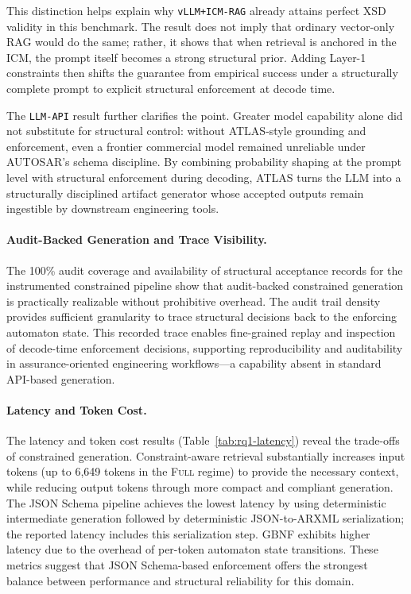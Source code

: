 \documentclass[acmlarge,nonacm]{acmart}
\theoremstyle{acmplain}
\theoremstyle{acmdefinition}
\begin{document}
This distinction helps explain why \texttt{vLLM+ICM-RAG} already attains perfect XSD validity in this benchmark. The result does not imply that ordinary vector-only RAG would do the same; rather, it shows that when retrieval is anchored in the ICM, the prompt itself becomes a strong structural prior. Adding Layer-1 constraints then shifts the guarantee from empirical success under a structurally complete prompt to explicit structural enforcement at decode time.

The \texttt{LLM-API} result further clarifies the point. Greater model capability alone did not substitute for structural control: without ATLAS-style grounding and enforcement, even a frontier commercial model remained unreliable under AUTOSAR's schema discipline. By combining probability shaping at the prompt level with structural enforcement during decoding, ATLAS turns the LLM into a structurally disciplined artifact generator whose accepted outputs remain ingestible by downstream engineering tools.

\paragraph{Audit-Backed Generation and Trace Visibility.}
The 100\% audit coverage and availability of structural acceptance records for the instrumented constrained pipeline show that audit-backed constrained generation is practically realizable without prohibitive overhead.
The audit trail density provides sufficient granularity to trace structural decisions back to the enforcing automaton state.
This recorded trace enables fine-grained replay and inspection of decode-time enforcement decisions, supporting reproducibility and auditability in assurance-oriented engineering workflows—a capability absent in standard API-based generation.

\paragraph{Latency and Token Cost.}
The latency and token cost results (Table~\ref{tab:rq1-latency}) reveal the trade-offs of constrained generation. Constraint-aware retrieval substantially increases input tokens (up to 6,649 tokens in the \textsc{Full} regime) to provide the necessary context, while reducing output tokens through more compact and compliant generation. The JSON Schema pipeline achieves the lowest latency by using deterministic intermediate generation followed by deterministic JSON-to-ARXML serialization; the reported latency includes this serialization step. GBNF exhibits higher latency due to the overhead of per-token automaton state transitions. These metrics suggest that JSON Schema-based enforcement offers the strongest balance between performance and structural reliability for this domain.
\end{document}
